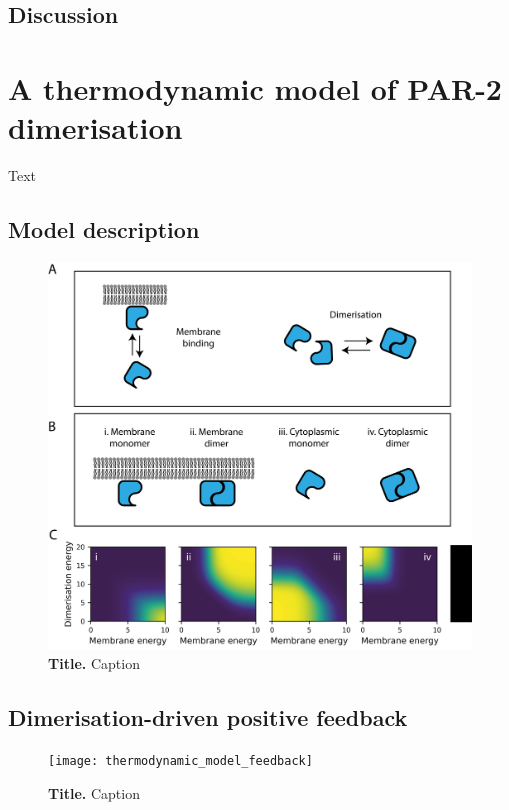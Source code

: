 \documentclass[12pt]{"article"}
\newcommand{\mycaption}[2]{\caption[#1]{\textbf{#1.} #2}}
\begin{document}
\subsection{Discussion}


\clearpage
\section{A thermodynamic model of PAR-2 dimerisation}

Text

\subsection{Model description}

\begin{figure}[!h]
\includegraphics[scale=0.9]{thermodynamic_model_species}
\setlength{\abovecaptionskip}{20pt}
\centering
\mycaption{Title}{Caption}
\end{figure}

\clearpage
\subsection{Dimerisation-driven positive feedback}

\begin{figure}[!h]
\texttt{[image: thermodynamic\_model\_feedback]}
\setlength{\abovecaptionskip}{20pt}
\centering
\mycaption{Title}{Caption}
\end{figure}
\end{document}
